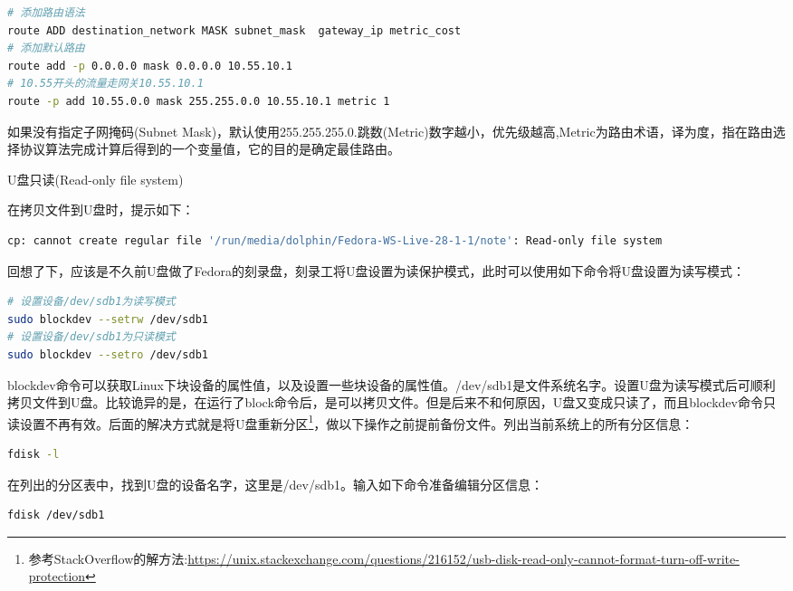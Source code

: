 \documentclass[8pt]{book}
\makeatletter
\numberwithin{dummy}{section}
\theoremstyle{ocrenumbox}
\theoremstyle{blacknumex}
\theoremstyle{blacknumbox}
\theoremstyle{ocrenum}
\renewcommand{\subsection}{\@startsection {subsection}{2}{\z@}
	{-3ex \@plus -0.1ex \@minus -.4ex}
	{0.5ex \@plus.2ex }
	{\normalfont\sffamily\bfseries}}
\makeatother
\begin{document}
\begin{lstlisting}[language=Bash]
# 添加路由语法
route ADD destination_network MASK subnet_mask  gateway_ip metric_cost
# 添加默认路由
route add -p 0.0.0.0 mask 0.0.0.0 10.55.10.1
# 10.55开头的流量走网关10.55.10.1
route -p add 10.55.0.0 mask 255.255.0.0 10.55.10.1 metric 1
\end{lstlisting}

如果没有指定子网掩码(Subnet Mask)，默认使用255.255.255.0.跳数(Metric)数字越小，优先级越高,Metric为路由术语，译为度，指在路由选择协议算法完成计算后得到的一个变量值，它的目的是确定最佳路由。

\subsection{U盘只读(Read-only file system)}

在拷贝文件到U盘时，提示如下：

\begin{lstlisting}[language=Bash]
cp: cannot create regular file '/run/media/dolphin/Fedora-WS-Live-28-1-1/note': Read-only file system
\end{lstlisting}

回想了下，应该是不久前U盘做了Fedora的刻录盘，刻录工将U盘设置为读保护模式，此时可以使用如下命令将U盘设置为读写模式：

\begin{lstlisting}[language=Bash]
# 设置设备/dev/sdb1为读写模式
sudo blockdev --setrw /dev/sdb1
# 设置设备/dev/sdb1为只读模式
sudo blockdev --setro /dev/sdb1
\end{lstlisting}

blockdev命令可以获取Linux下块设备的属性值，以及设置一些块设备的属性值。/dev/sdb1是文件系统名字。设置U盘为读写模式后可顺利拷贝文件到U盘。比较诡异的是，在运行了block命令后，是可以拷贝文件。但是后来不和何原因，U盘又变成只读了，而且blockdev命令只读设置不再有效。后面的解决方式就是将U盘重新分区\footnote{参考StackOverflow的解方法:\url{https://unix.stackexchange.com/questions/216152/usb-disk-read-only-cannot-format-turn-off-write-protection}}，做以下操作之前提前备份文件。列出当前系统上的所有分区信息：

\begin{lstlisting}[language=Bash]
fdisk -l
\end{lstlisting}

在列出的分区表中，找到U盘的设备名字，这里是/dev/sdb1。输入如下命令准备编辑分区信息：

\begin{lstlisting}[language=Bash]
fdisk /dev/sdb1
\end{lstlisting}
\end{document}
